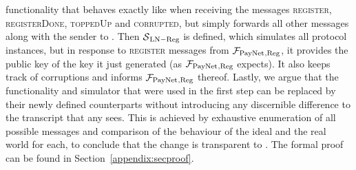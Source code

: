   functionality that behaves exactly like \fpaynet{} when receiving the messages
  \textsc{register}, \textsc{registerDone}, \textsc{toppedUp} and
  \textsc{corrupted}, but simply forwards all other messages along with the
  sender to \simulator. Then $\mathcal{S}{}_{\mathrm{LN - Reg}}$ is defined,
  which simulates all protocol instances, but in response to \textsc{register}
  messages from $\mathcal{F}_{\mathrm{PayNet}}{}_{\mathrm{, Reg}}$, it provides the public key of the
  key it just generated (as $\mathcal{F}_{\mathrm{PayNet}}{}_{\mathrm{, Reg}}$ expects). It also
  keeps track of corruptions and informs $\mathcal{F}_{\mathrm{PayNet}}{}_{\mathrm{, Reg}}$ thereof.
  Lastly, we argue that the functionality and simulator that were used in  the
  first step can be replaced by their newly defined counterparts without
  introducing any discernible difference to the transcript that any
  \environment{} sees. This is achieved by exhaustive enumeration of all
  possible messages and comparison of the behaviour of the ideal and the real
  world for each, to conclude that the change is transparent to \environment.
  The formal proof can be found in Section~\ref{appendix:secproof}.
